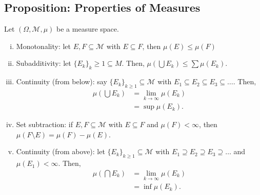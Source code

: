 \documentclass[10pt]{extarticle}
\begin{document}
  \subsection{Proposition: Properties of Measures}%
  Let $(\Omega,\mathcal{M},\mu)$ be a measure space.
  \begin{enumerate}[(i)]
    \item Monotonality: let $E,F\subseteq \mathcal{M}$ with $E\subseteq F$, then $\mu(E) \leq \mu(F)$
    \item Subadditivity: let $\{E_k\}_k\geq 1\subseteq M$. Then, $\mu\left(\bigcup E_k\right)\leq \sum \mu(E_k)$.
    \item Continuity (from below): say $\{E_k\}_{k\geq 1}\subseteq \mathcal{M}$ with $E_1\subseteq E_2\subseteq E_3\subseteq \dots$. Then, 
      \begin{align*}
        \mu\left(\bigcup E_k\right) &= \lim_{k\rightarrow\infty}\mu(E_k)\\
        &= \sup \mu(E_k).
      \end{align*}
    \item Set subtraction: if $E,F\subseteq \mathcal{M}$ with $E \subseteq F$ and $\mu(F) < \infty$, then $\mu(F\setminus E) = \mu(F) - \mu(E)$.
    \item Continuity (from above): let $\{E_k\}_{k\geq 1} \subseteq \mathcal{M}$ with $E_1\supseteq E_2\supseteq E_3\supseteq \dots$ and $\mu(E_1) < \infty$. Then,
      \begin{align*}
        \mu\left(\bigcap E_k\right) &= \lim_{k\rightarrow\infty}\mu(E_k)\\
                                    &= \inf \mu(E_k).
      \end{align*}
  \end{enumerate}
\end{document}
